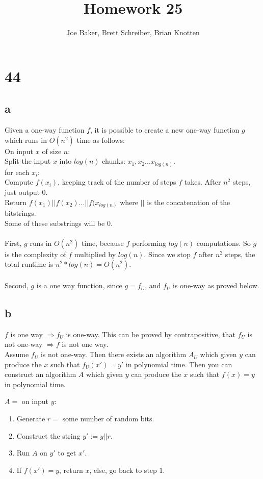 \documentclass[letterpaper,notitlepage,twoside]{article}
\renewcommand{\implies}{\Rightarrow} %
\newcommand\tab[1][1cm]{\hspace*{#1}} %
\begin{document}
\title{Homework 25}
\author{Joe Baker, Brett Schreiber, Brian Knotten}
\maketitle
\section*{44}
\subsection*{a}
Given a one-way function $f$, it is possible to create a new one-way function $g$ which runs in $O(n^2)$ time as follows: \\
On input $x$ of size $n$: \\
\tab Split the input $x$ into $log(n)$ chunks: $x_1, x_2...x_{log(n)}$. \\
\tab for each $x_i$: \\
\tab \tab Compute $f(x_i)$, keeping track of the number of steps $f$ takes. After $n^2$ steps, just output $0$.\\
\tab Return $f(x_1) || f(x_2) ... || f(x_{log(n)}$ where $||$ is the concatenation of the bitstrings. \\
\tab Some of these substrings will be $0$.\\\\
First, $g$ runs in $O(n^2)$ time, because $f$ performing $log(n)$ computations. So $g$ is the complexity of $f$ multiplied by $log(n)$. Since we stop $f$ after $n^2$ steps, the total runtime is $n^2 * log(n) = O(n^2)$. \\\\
Second, $g$ is a one way function, since $g = f_U$, and $f_U$ is one-way as proved below.

\subsection*{b}
$f$ is one way $\implies f_U$ is one-way. This can be proved by contrapositive, that $f_U$ is not one-way $\implies f$ is not one way. \\
Assume $f_U$ is not one-way. Then there exists an algorithm $A_U$ which given $y$ can produce the $x$ such that $f_U(x') = y'$ in polynomial time. Then you can construct an algorithm $A$ which given $y$ can produce the $x$ such that $f(x) = y$ in polynomial time.

$A =$ on input $y$:
\begin{enumerate}
\item Generate $r = $ some number of random bits.
\item Construct the string $y' := y || r$.
\item Run $A$ on $y'$ to get $x'$.
\item If $f(x') = y$, return $x$, else, go back to step $1$.
\end{enumerate}
\end{document}
